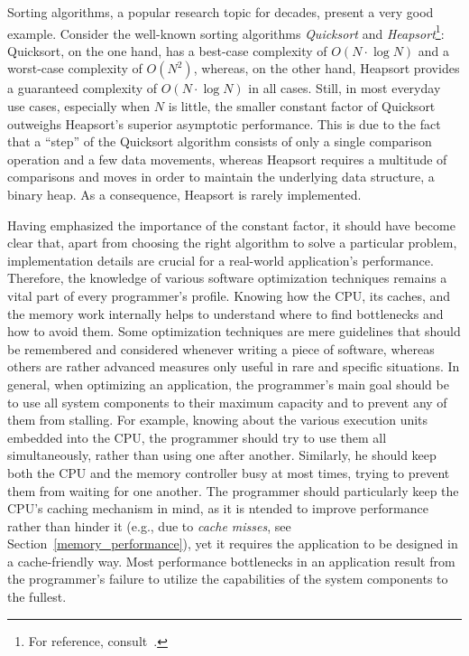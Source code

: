 Sorting algorithms, a popular research topic for decades, present a very good example. Consider the well-known sorting algorithms \emph{Quicksort} and \emph{Heapsort}\footnote{For reference, consult~\cite[pp. 113--122, 144--148]{knuth1998art}.}: Quicksort, on the one hand, has a best-case complexity of $O(N\cdot \log{N})$ and a worst-case complexity of $O(N^{2})$, whereas, on the other hand, Heapsort provides a guaranteed complexity of $O(N\cdot \log{N})$ in all cases. Still, in most everyday use cases, especially when $N$ is little, the smaller constant factor of Quicksort outweighs Heapsort's superior asymptotic performance. This is due to the fact that a ``step'' of the Quicksort algorithm consists of only a single comparison operation and a few data movements, whereas Heapsort requires a multitude of comparisons and moves in order to maintain the underlying data structure, a binary heap. As a consequence, Heapsort is rarely implemented.

Having emphasized the importance of the constant factor, it should have become clear that, apart from choosing the right algorithm to solve a particular problem, implementation details are crucial for a real-world application's performance. Therefore, the knowledge of various software optimization techniques remains a vital part of every programmer's profile. Knowing how the CPU, its caches, and the memory work internally helps to understand where to find bottlenecks and how to avoid them. Some optimization techniques are mere guidelines that should be remembered and considered whenever writing a piece of software, whereas others are rather advanced measures only useful in rare and specific situations. In general, when optimizing an application, the programmer's main goal should be to use all system components to their maximum capacity and to prevent any of them from stalling. For example, knowing about the various execution units embedded into the CPU, the programmer should try to use them all simultaneously, rather than using one after another. Similarly, he should keep both the CPU and the memory controller busy at most times, trying to prevent them from waiting for one another. The programmer should particularly keep the CPU's caching mechanism in mind, as it is ntended to improve performance rather than hinder it (e.g., due to \emph{cache misses}, see Section~\ref{memory_performance}), yet it requires the application to be designed in a cache-friendly way. Most performance bottlenecks in an application result from the programmer's failure to utilize the capabilities of the system components to the fullest.

